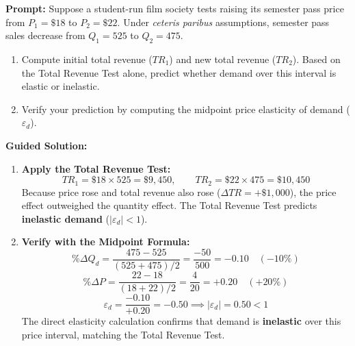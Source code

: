 \documentclass[11pt,letterpaper]{article}
\begin{document}
\begin{tcolorbox}[colback=CourseTeal!8!white,colframe=CourseTeal,title=\textbf{Work It Out: Connecting Midpoint Elasticity and the Total Revenue Test}]
\textbf{Prompt:} Suppose a student-run film society tests raising its semester pass price from $P_1 = \$18$ to $P_2 = \$22$. Under \emph{ceteris paribus} assumptions, semester pass sales decrease from $Q_1 = 525$ to $Q_2 = 475$.
\begin{enumerate}
    \item Compute initial total revenue ($TR_1$) and new total revenue ($TR_2$). Based on the Total Revenue Test alone, predict whether demand over this interval is elastic or inelastic.
    \item Verify your prediction by computing the midpoint price elasticity of demand ($\varepsilon_d$).
\end{enumerate}
\textbf{Guided Solution:}
\begin{enumerate}
    \item \textbf{Apply the Total Revenue Test:}
    \[
    TR_1 = \$18 \times 525 = \$9{,}450, \qquad TR_2 = \$22 \times 475 = \$10{,}450
    \]
    Because price rose and total revenue also rose ($\Delta TR = +\$1{,}000$), the price effect outweighed the quantity effect. The Total Revenue Test predicts \textbf{inelastic demand} ($|\varepsilon_d| < 1$).
    \item \textbf{Verify with the Midpoint Formula:}
    \[
    \%\Delta Q_d = \frac{475 - 525}{(525 + 475)/2} = \frac{-50}{500} = -0.10 \quad (-10\%)
    \]
    \[
    \%\Delta P = \frac{22 - 18}{(18 + 22)/2} = \frac{4}{20} = +0.20 \quad (+20\%)
    \]
    \[
    \varepsilon_d = \frac{-0.10}{+0.20} = -0.50 \implies |\varepsilon_d| = \mathbf{0.50} < 1
    \]
    The direct elasticity calculation confirms that demand is \textbf{inelastic} over this price interval, matching the Total Revenue Test.
\end{enumerate}
\end{tcolorbox}
\end{document}
